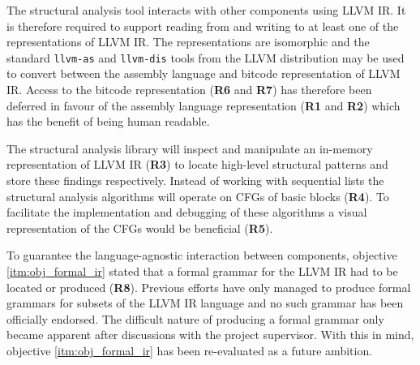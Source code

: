 The structural analysis tool interacts with other components using LLVM IR. It is therefore required to support reading from and writing to at least one of the representations of LLVM IR. The representations are isomorphic and the standard \texttt{llvm-as} and \texttt{llvm-dis} tools from the LLVM distribution may be used to convert between the assembly language and bitcode representation of LLVM IR. Access to the bitcode representation (\textbf{R6} and \textbf{R7}) has therefore been deferred in favour of the assembly language representation (\textbf{R1} and \textbf{R2}) which has the benefit of being human readable.

The structural analysis library will inspect and manipulate an in-memory representation of LLVM IR (\textbf{R3}) to locate high-level structural patterns and store these findings respectively. Instead of working with sequential lists the structural analysis algorithms will operate on CFGs of basic blocks (\textbf{R4}). To facilitate the implementation and debugging of these algorithms a visual representation of the CFGs would be beneficial (\textbf{R5}).

To guarantee the language-agnostic interaction between components, objective \ref{itm:obj_formal_ir} stated that a formal grammar for the LLVM IR had to be located or produced (\textbf{R8}). Previous efforts have only managed to produce formal grammars for subsets of the LLVM IR language \cite{formal_llvm_ir_spec,formalizing_llvm_ir} and no such grammar has been officially endorsed. The difficult nature of producing a formal grammar only became apparent after discussions with the project supervisor. With this in mind, objective \ref{itm:obj_formal_ir} has been re-evaluated as a future ambition.

